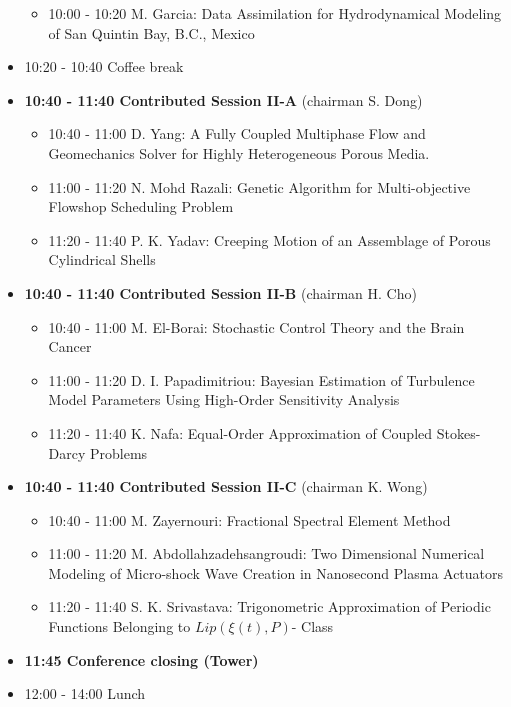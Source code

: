 \documentclass[10pt, A4]{article}%
\begin{document}
\begin{itemize}
\begin{itemize}
    \item 10:00 - 10:20 {M. Garcia}: {Data Assimilation for Hydrodynamical Modeling of San Quintin Bay, B.C., Mexico}
  \end{itemize}
  \item 10:20 - 10:40 Coffee break
  \item {\bf 10:40 - 11:40 Contributed Session II-A} (chairman S. Dong) 
  \begin{itemize}
    \item 10:40 - 11:00 {D. Yang}: {A Fully Coupled Multiphase Flow and Geomechanics Solver for Highly Heterogeneous Porous Media.} %
    \item 11:00 - 11:20 {N. Mohd Razali}: {Genetic Algorithm for Multi-objective Flowshop Scheduling Problem} %
    \item 11:20 - 11:40 {P. K. Yadav}: {Creeping Motion of an Assemblage of Porous Cylindrical Shells}
  \end{itemize}
  \item {\bf 10:40 - 11:40 Contributed Session II-B} (chairman H. Cho) 
  \begin{itemize}
    \item 10:40 - 11:00 {M. El-Borai}: {Stochastic Control Theory and the Brain Cancer}   
    \item 11:00 - 11:20 {D. I. Papadimitriou}: {Bayesian Estimation of Turbulence Model Parameters Using High-Order Sensitivity Analysis}
    \item 11:20 - 11:40 {K. Nafa}: {Equal-Order Approximation of Coupled Stokes-Darcy Problems}
  \end{itemize}
  \item {\bf 10:40 - 11:40 Contributed Session II-C} (chairman K. Wong) 
  \begin{itemize}
    \item 10:40 - 11:00 {M. Zayernouri}: {Fractional Spectral Element Method}   
    \item 11:00 - 11:20 {M. Abdollahzadehsangroudi}: {Two Dimensional Numerical Modeling of Micro-shock Wave Creation in Nanosecond Plasma Actuators}
    \item 11:20 - 11:40 {S. K. Srivastava}: {Trigonometric Approximation of Periodic Functions Belonging to $Lip(\xi(t), P)$- Class}
  \end{itemize}
  \item {\bf 11:45 Conference closing (Tower)}
  \item 12:00 - 14:00 Lunch
\newpage
\end{itemize}
\end{document}
